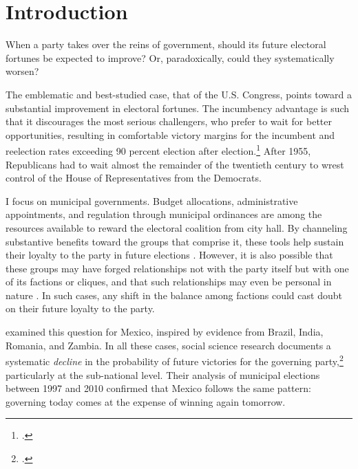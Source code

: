 \documentclass[letter,12pt]{article}
\begin{document}
\newpage 

\onehalfspacing

\section{Introduction}

\noindent When a party takes over the reins of government, should its future electoral fortunes be expected to improve? Or, paradoxically, could they systematically worsen?

The emblematic and best-studied case, that of the U.S. Congress, points toward a substantial improvement in electoral fortunes. The incumbency advantage is such that it discourages the most serious challengers, who prefer to wait for better opportunities, resulting in comfortable victory margins for the incumbent and reelection rates exceeding 90 percent election after election.\footnote{\citet{erikson1971incumbency, mayhew1974vanishingMg, jacobson.1987.runningScared, cox.katz.1996, ansolabehere.snyder.IncAdv2002, gelman.king.1991incumbency}.} After 1955, Republicans had to wait almost the remainder of the twentieth century to wrest control of the House of Representatives from the Democrats.

I focus on municipal governments. Budget allocations, administrative appointments, and regulation through municipal ordinances are among the resources available to reward the electoral coalition from city hall. By channeling substantive benefits toward the groups that comprise it, these tools help sustain their loyalty to the party in future elections \citep{cox.mccubbins.1986, stokes.Argentina2005, diaz-estevez-magaloni-Poverty-book.2016}. However, it is also possible that these groups may have forged relationships not with the party itself but with one of its factions or cliques, and that such relationships may even be personal in nature \citep{cain.etal.1987}. In such cases, any shift in the balance among factions could cast doubt on their future loyalty to the party.

\citet{lucardi.rosas.Incumbency.2016} examined this question for Mexico, inspired by evidence from Brazil, India, Romania, and Zambia. In all these cases, social science research documents a systematic \emph{decline} in the probability of future victories for the governing party,\footnote{\citet{brambor.ceneviva.BrasilReeleccionMunic.2012, klasnja.titiunik.IncumbCurse.2023, uppal.IncumbencyIndia.2009}.} particularly at the sub-national level. Their analysis of municipal elections between 1997 and 2010 confirmed that Mexico follows the same pattern: governing today comes at the expense of winning again tomorrow.
\end{document}
